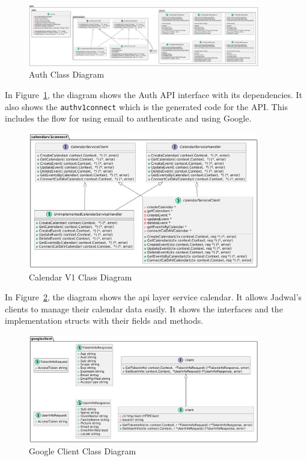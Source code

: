 \newpage

\begin{figure}[!h]
    \centering
    \includegraphics[width=0.9\textwidth]{images/docs/diagrams/class/class-diagram/auth.png}
    \caption{Auth Class Diagram}
    \label{fig:auth-class-diagram}
\end{figure}

In Figure~\ref{fig:auth-class-diagram}, the diagram shows the Auth API interface with its dependencies.
It also shows the \texttt{authv1connect} which is the generated code for the API\@.
This includes the flow for using email to authenticate and using Google.

\newpage

\begin{figure}[!h]
    \centering
    \includegraphics[width=0.9\textwidth]{images/docs/diagrams/class/class-diagram/calendarv1.png}
    \caption{Calendar V1 Class Diagram}
    \label{fig:calendar-v1-class-diagram}
\end{figure}

In Figure~\ref{fig:calendar-v1-class-diagram}, the diagram shows the api layer service calendar.
It allows Jadwal's clients to manage their calendar data easily.
It shows the interfaces and the implementation structs with their fields and methods.

\newpage

\begin{figure}[!h]
    \centering
    \includegraphics[width=0.9\textwidth]{images/docs/diagrams/class/class-diagram/googleclient.png}
    \caption{Google Client Class Diagram}
    \label{fig:googleclient-class-diagram}
\end{figure}

